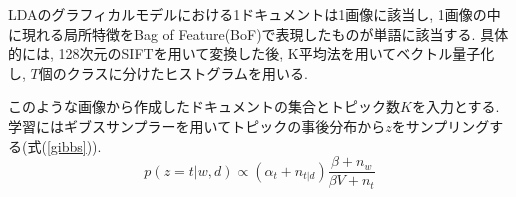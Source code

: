 \par
LDAのグラフィカルモデルにおける1ドキュメントは1画像に該当し, 
1画像の中に現れる局所特徴をBag of Feature(BoF)で表現したものが単語に該当する.
具体的には, 128次元のSIFT\cite{sift}を用いて変換した後, 
K平均法\cite{kmeans}を用いてベクトル量子化し, $T$個のクラスに分けたヒストグラムを用いる.
\par
このような画像から作成したドキュメントの集合とトピック数$K$を入力とする.
学習にはギブスサンプラーを用いてトピックの事後分布から$z$をサンプリングする(式(\ref{gibbs})).
\begin{equation}
p(z = t|w, d) \propto ( \alpha_{t} + n_{t|d} ) \frac{\beta + n_w}{\beta V + n_t}
\label{gibbs}
\end{equation}
\par


